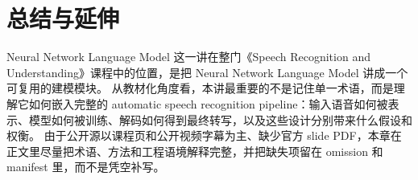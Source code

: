 \documentclass[a4paper]{article}
\begin{document}
\section{总结与延伸}
Neural Network Language Model 这一讲在整门《Speech Recognition and Understanding》课程中的位置，是把 Neural Network Language Model 讲成一个可复用的建模模块。
从教材化角度看，本讲最重要的不是记住单一术语，而是理解它如何嵌入完整的 automatic speech recognition pipeline：输入语音如何被表示、模型如何被训练、解码如何得到最终转写，以及这些设计分别带来什么假设和权衡。
由于公开源以课程页和公开视频字幕为主、缺少官方 slide PDF，本章在正文里尽量把术语、方法和工程语境解释完整，并把缺失项留在 omission 和 manifest 里，而不是凭空补写。
\end{document}
